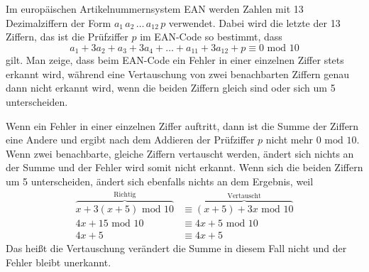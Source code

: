 \documentclass[a4paper, margins=2.5cm]{homework}
\begin{document}
\begin{problem}
	Im europäischen Artikelnummernsystem EAN werden Zahlen mit 13 Dezimalziffern
	der Form $a_1\, a_2\, …\, a_{12}\, p$ verwendet. Dabei wird die letzte der
	13 Ziffern, das ist die Prüfziffer $p$ im EAN-Code so bestimmt, dass
	\[ a_1+3a_2+a_3+3a_4+…+a_{11}+3a_{12} + p \equiv 0 \text{ mod } 10 \]
	gilt. Man zeige, dass beim EAN-Code ein Fehler in einer einzelnen Ziffer stets
	erkannt wird, während eine Vertauschung von zwei benachbarten Ziffern genau dann
	nicht erkannt wird, wenn die beiden Ziffern gleich sind oder sich um 5 unterscheiden.
\end{problem}
\begin{solution}
	Wenn ein Fehler in einer einzelnen Ziffer auftritt, dann ist die Summe der
	Ziffern eine Andere und ergibt nach dem Addieren der Prüfziffer $p$ nicht mehr
	$0 \text{ mod } 10$. Wenn zwei benachbarte, gleiche Ziffern vertauscht werden,
	ändert sich nichts an der Summe und der Fehler wird somit nicht erkannt. Wenn
	sich die beiden Ziffern um 5 unterscheiden, ändert sich ebenfalls nichts an
	dem Ergebnis, weil
	\begin{align*}
		\overbrace{x+3(x+5) \text{ mod } 10}^\text{Richtig} & \equiv
		\overbrace{(x+5)+3x \text{ mod } 10}^\text{Vertauscht} \\
		4x+15 \text{ mod } 10 & \equiv 4x+5 \text{ mod } 10 \\
		4x+5 & \equiv 4x+5
	\end{align*}
	Das heißt die Vertauschung verändert die Summe in diesem Fall nicht und der Fehler
	bleibt unerkannt.
\end{solution}
\end{document}

